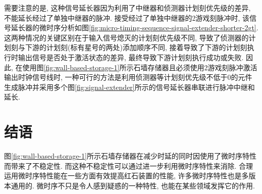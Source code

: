 \documentclass{article}
\begin{document}
    需要注意的是, 这种信号延长器因为利用了中继器和侦测器计划刻优先级的差异, 不能延长经过了单独中继器的脉冲. 接受经过了单独中继器的2游戏刻脉冲时, 该信号延长器的微时序分析如图\ref{fig:micro-timing-sequence-signal-extender-shorter-2gt}. 这两种情况的关键区别在于输入信号熄灭的计划刻优先级不同, 导致了侦测器的计划刻与下游的计划刻(标有星号的两处)添加顺序不同, 接着导致了下游的计划刻执行时输出信号是否处于激活状态的差异, 最终导致下游计划刻执行成功或失败. 因此, 在使用图\ref{fig:wall-based-storage-1}所示石墙存储器且必须使用2游戏刻脉冲激活输出时钟信号线时, 一种可行的方法是利用侦测器等计划刻优先级不低于0的元件生成脉冲并采用多个图\ref{fig:signal-extender}所示的信号延长器串联进行脉冲中继和延长.

    \section{结语}
    图\ref{fig:wall-based-storage-1}所示石墙存储器在减少时延的同时因使用了微时序特性而带来了不稳定性. 而这种不稳定性可以通过进一步利用微时序特性来消除. 合理运用微时序特性能在一些方面有效提高红石装置的性能, 许多微时序特性也是多版本通用的. 微时序不只是令人感到疑惑的一种特性, 也能在某些领域发挥它的作用.
    
\end{document}
